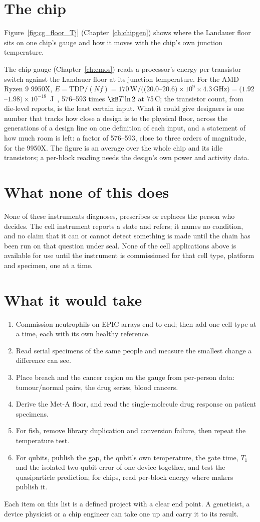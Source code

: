 \section{The chip}
Figure~\ref{fig:cg_floor_Tj} (Chapter~\ref{ch:chipgen}) shows where the Landauer floor sits on one chip's gauge and how it moves with the chip's own
junction temperature.

The chip gauge (Chapter~\ref{ch:cmos}) reads a processor's energy per transistor switch against the Landauer floor at its junction temperature. For
the AMD Ryzen 9 9950X, $E=\mathrm{TDP}/(Nf)=170\,\mathrm W/((20.0$--$20.6)\times10^9\times4.3\,\mathrm{GHz})=(1.92$--$1.98)\times10^{-18}$~J~\cite{AMD9950X}, 576--593 times
$\kB T\ln2$ at 75\,\textdegree C; the transistor count, from die-level reports, is the least certain input. \calc{} What it could give designers is one number that tracks how close a design is to the physical floor, across
the generations of a design line on one definition of each input, and a statement of how much room is left: a factor of 576--593, close to three orders of magnitude, for the 9950X. The figure is an average over the whole chip and its idle transistors;
a per-block reading needs the design's own power and activity data. \openprob

\section{What none of this does}

None of these instruments diagnoses, prescribes or replaces the person who decides. The cell instrument reports a state and refers; it names
no condition, and no claim that it can or cannot detect something is made until the chain has been run on that question under seal. None of the
cell applications above is available for use until the instrument is commissioned for that cell type, platform and specimen, one at a time.

\section{What it would take}
\begin{enumerate}
\item Commission neutrophils on EPIC arrays end to end; then add one cell type at a time, each with its own healthy reference.
\item Read serial specimens of the same people and measure the smallest change a difference can see.
\item Place breach and the cancer region on the gauge from per-person data: tumour/normal pairs, the drug series, blood cancers.
\item Derive the Met-A floor, and read the single-molecule drug response on patient specimens.
\item For fish, remove library duplication and conversion failure, then repeat the temperature test.
\item For qubits, publish the gap, the qubit's own temperature, the gate time, $T_1$ and the isolated two-qubit error of one device together, and test the
quasiparticle prediction; for chips, read per-block energy where makers publish it.
\end{enumerate}

Each item on this list is a defined project with a clear end point. A geneticist, a device physicist or a chip engineer can take one up and carry it to its result.
